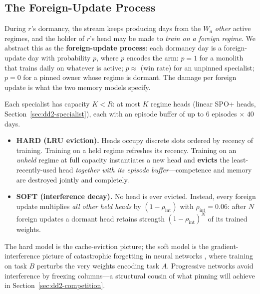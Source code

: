 \subsection{The Foreign-Update Process}

During $r$'s dormancy, the stream keeps producing days from the $W_a$
\emph{other} active regimes, and the holder of $r$'s head may be made to
\emph{train on a foreign regime}. We abstract this as the
\textbf{foreign-update process}: each dormancy day is a foreign-update day
with probability $p$, where $p$ encodes the arm: $p = 1$ for a monolith that
trains daily on whatever is active; $p \approx$ (win rate) for an unpinned
\nm{} specialist; $p = 0$ for a pinned owner whose regime is dormant. The
damage per foreign update is what the two memory models specify.

\begin{definition}
\label{def:dd2-memory-models}
Each specialist has capacity $K < R$: at most $K$ regime heads (linear SPO+
heads, Section~\ref{sec:dd2-specialist}), each with an episode buffer of up to
$6$ episodes $\times$ $40$ days.
\begin{itemize}
  \item \textbf{HARD (LRU eviction).} Heads occupy discrete slots ordered by
        recency of training. Training on a held regime refreshes its recency.
        Training on an \emph{unheld} regime at full capacity instantiates a
        new head and \textbf{evicts} the least-recently-used head
        \emph{together with its episode buffer}---competence and memory are
        destroyed jointly and completely.
  \item \textbf{SOFT (interference decay).} No head is ever evicted. Instead,
        every foreign update multiplies \emph{all other held heads} by
        $(1 - \rho_{\mathrm{int}})$ with $\rho_{\mathrm{int}} = 0.06$:
        after $N$ foreign updates a dormant head retains strength
        $(1 - \rho_{\mathrm{int}})^{N}$ of its trained weights.
\end{itemize}
\end{definition}

The hard model is the cache-eviction picture; the soft model is the
gradient-interference picture of catastrophic forgetting in neural networks
\citep{french1999catastrophic, kirkpatrick2017overcoming, parisi2019continual},
where training on task $B$ perturbs the very weights encoding task $A$.
Progressive networks \citep{rusu2016progressive} avoid interference by
freezing columns---a structural cousin of what pinning will achieve in
Section~\ref{sec:dd2-competition}.

